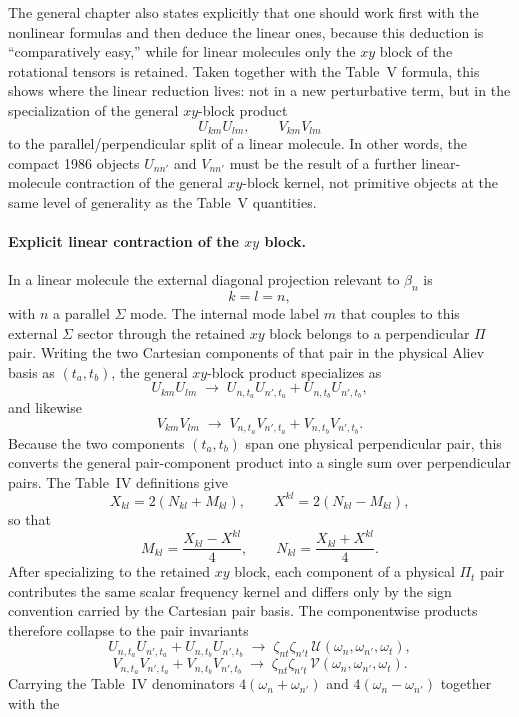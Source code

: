 \documentclass[11pt]{article}
\begin{document}
The general chapter also states explicitly that one should work first with the
nonlinear formulas and then deduce the linear ones, because this deduction is
``comparatively easy,'' while for linear molecules only the $xy$ block of the
rotational tensors is retained. Taken together with the Table~V formula, this
shows where the linear reduction lives: not in a new perturbative term,
but in the specialization of the general $xy$-block product
\[
U_{km}U_{lm},\qquad V_{km}V_{lm}
\]
to the parallel/perpendicular split of a linear molecule. In other words, the
compact 1986 objects $U_{nn'}$ and $V_{nn'}$ must be the result of a further
linear-molecule contraction of the general $xy$-block kernel, not primitive
objects at the same level of generality as the Table~V quantities.

\paragraph{Explicit linear contraction of the $xy$ block.}
In a linear molecule the external diagonal projection relevant to $\beta_n$ is
\[
k=l=n,
\]
with $n$ a parallel $\Sigma$ mode. The internal mode label $m$ that couples to
this external $\Sigma$ sector through the retained $xy$ block belongs to a
perpendicular $\Pi$ pair. Writing the two Cartesian components of that pair in
the physical Aliev basis as $(t_a,t_b)$, the general $xy$-block product
specializes as
\[
U_{km}U_{lm}
\;\longrightarrow\;
U_{n,t_a}U_{n',t_a}+U_{n,t_b}U_{n',t_b},
\]
and likewise
\[
V_{km}V_{lm}
\;\longrightarrow\;
V_{n,t_a}V_{n',t_a}+V_{n,t_b}V_{n',t_b}.
\]
Because the two components $(t_a,t_b)$ span one physical perpendicular pair,
this converts the general pair-component product into a single sum over
perpendicular pairs. The Table~IV definitions give
\[
X_{kl}=2(N_{kl}+M_{kl}),\qquad X^{kl}=2(N_{kl}-M_{kl}),
\]
so that
\[
M_{kl}=\frac{X_{kl}-X^{kl}}{4},\qquad
N_{kl}=\frac{X_{kl}+X^{kl}}{4}.
\]
After specializing to the retained $xy$ block, each component of a physical
$\Pi_t$ pair contributes the same scalar frequency kernel and differs only by
the sign convention carried by the Cartesian pair basis. The componentwise
products therefore collapse to the pair invariants
\[
U_{n,t_a}U_{n',t_a}+U_{n,t_b}U_{n',t_b}
\;\longrightarrow\;
\zeta_{nt}\zeta_{n't}\,\mathcal U(\omega_n,\omega_{n'},\omega_t),
\]
\[
V_{n,t_a}V_{n',t_a}+V_{n,t_b}V_{n',t_b}
\;\longrightarrow\;
\zeta_{nt}\zeta_{n't}\,\mathcal V(\omega_n,\omega_{n'},\omega_t).
\]
Carrying the Table~IV denominators
$4(\omega_n+\omega_{n'})$ and $4(\omega_n-\omega_{n'})$ together with the
\end{document}
